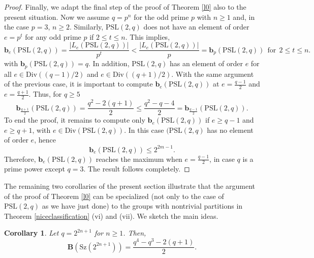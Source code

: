 \documentclass{amsart}
\newtheorem{corollary}[theorem]{Corollary}
\theoremstyle{definition}
\numberwithin{equation}{section}
\begin{document}
\begin{proof}
Finally, we adapt the final step of the proof of Theorem \ref{l0} also to the present situation. Now we assume $q=p^n$ for the odd prime $p$ with $n\geq 1$ and, in the case $p=3$,  $n\geq 2$. Similarly, $\mathrm{PSL}(2,q)$ does not have an element of order $e=p^t$ for any odd prime $p$ if $2\leq t \leq n$. This implies,
\begin{equation}
\mathbf{b}_e(\mathrm{PSL}(2,q))=\frac{|L_e(\mathrm{PSL}(2,q))|}{p^t} < \frac{|L_e(\mathrm{PSL}(2,q))|}{p}=\mathbf{b}_{p}(\mathrm{PSL}(2,q)) \ \ \mbox{for} \ \ 2\leq t\leq n.
\end{equation}
with $\mathbf{b}_{p}(\mathrm{PSL}(2,q))=q.$    In addition, $\mathrm{PSL}(2,q)$ has an element of order $e$ for all $e\in \mathrm{Div}((q-1)/2)$ and $e\in \mathrm{Div}((q+1)/2)$.  With the same argument of the previous case, it is important to compute $\mathbf{b}_{e}(\mathrm{PSL}(2,q))$ at $e=\frac{q-1}{2}$ and $e=\frac{q+1}{2}$. Thus, for $q\geq 5$
\begin{equation}
    \mathbf{b}_{\frac{q+1}{2}}(\mathrm{PSL}(2,q))= \frac{q^2-2(q+1)}{2}\leq  \frac{q^2-q-4}{2}=\mathbf{b}_{\frac{q-1}{2}}(\mathrm{PSL}(2,q)). 
\end{equation} 
To end the proof, it remains to compute only $\mathbf{b}_e(\mathrm{PSL}(2,q))$ if $e\geq q-1$ and $e\ge q+1$, with $e\in \mathrm{Div}(\mathrm{PSL}(2,q))$. In this case  $(\mathrm{PSL}(2,q)$ has no element of order $e$, hence
\begin{equation}
    \mathbf{b}_e(\mathrm{PSL}(2,q)) \leq 2^{2m-1}.
\end{equation} 
Therefore, $\mathbf{b}_e(\mathrm{PSL}(2,q))$  reaches the maximum when $e=\frac{q-1}{2}$, in case $q$ is a prime power except $q=3$.  The result follows completely.  
\end{proof}

The remaining two corollaries of the present section illustrate that the argument of the proof of Theorem \ref{l0} can be specialized (not only to the case of $\mathrm{PSL}(2,q)$ as we have just done) to the groups with nontrivial partitions in Theorem \ref{niceclassification} (vi) and (vii). We sketch the main ideas.


\begin{corollary}\label{l2} Let $q=2^{2n+1}$ for $n \ge 1$. Then,
\begin{equation}\mathbf{B}(\mathrm{Sz}(2^{2n+1}))= \frac{q^4-q^3-2(q+1)}{2}.
 \end{equation} 
\end{corollary}
\end{document}
